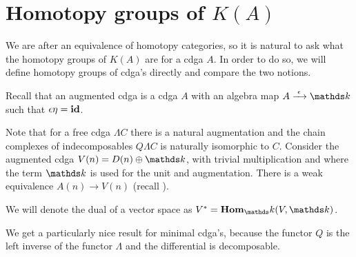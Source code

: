 \section{Homotopy groups of \texorpdfstring{$K(A)$}{K(A)}}
We are after an equivalence of homotopy categories, so it is natural to ask what the homotopy groups of $K(A)$ are for a cdga $A$. In order to do so, we will define homotopy groups of cdga's directly and compare the two notions.

Recall that an augmented cdga is a cdga $A$ with an algebra map $A \tot{\counit} \k$ such that $\epsilon \eta = \mathbf{id}$.


Note that for a free cdga $\Lambda C$ there is a natural augmentation and the chain complexes of indecomposables $Q \Lambda C$ is naturally isomorphic to $C$. Consider the augmented cdga $V(n) = D(n) \oplus \k$, with trivial multiplication and where the term $\k$ is used for the unit and augmentation. There is a weak equivalence $A(n) \to V(n)$ (recall ).


We will denote the dual of a vector space as $V^\ast = \Hom_\k(V, \k)$.


We get a particularly nice result for minimal cdga's, because the functor $Q$ is the left inverse of the functor $\Lambda$ and the differential is decomposable.

